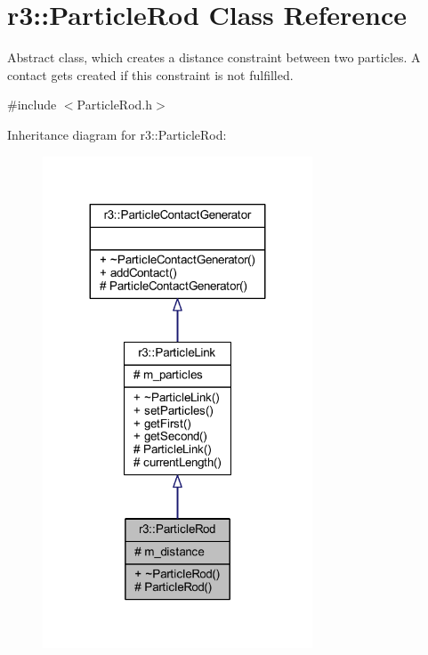 \hypertarget{classr3_1_1_particle_rod}{}\section{r3\+:\+:Particle\+Rod Class Reference}
\label{classr3_1_1_particle_rod}


Abstract class, which creates a distance constraint between two particles. A contact gets created if this constraint is not fulfilled.  




{\ttfamily \#include $<$Particle\+Rod.\+h$>$}



Inheritance diagram for r3\+:\+:Particle\+Rod\+:\nopagebreak
\begin{figure}[H]
\begin{center}
\leavevmode
\includegraphics[width=227pt]{classr3_1_1_particle_rod__inherit__graph}
\end{center}
\end{figure}


